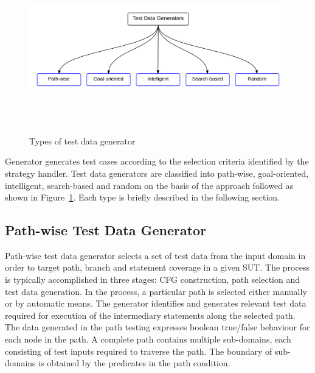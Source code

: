 \bigskip
\begin{figure}[h]
	\centering
	\centerline{\includegraphics[width=16.5cm, height=7.2cm ]{chapter2/Generators.png}}
	\bigskip
	\caption{Types of test data generator}
	\label{testDataGenerators_2}
\end{figure}
\bigskip

Generator generates test cases according to the selection criteria identified by the strategy handler. Test data generators are classified into path-wise, goal-oriented, intelligent, search-based and random on the basis of the approach followed as shown in Figure~\ref{testDataGenerators_2}. Each type is briefly described in the following section.

\subsection{Path-wise Test Data Generator} 
\label{sec:pathwise_2}
Path-wise test data generator selects a set of test data from the input domain in order to target path, branch and statement coverage in a given SUT. The process is typically accomplished in three stages: CFG construction, path selection and test data generation. In the process, a particular path is selected either manually or by automatic means. The generator identifies and generates relevant test data required for execution of the intermediary statements along the selected path. The data generated in the path testing expresses boolean true/false behaviour for each node in the path. A complete path contains multiple sub-domains, each consisting of test inputs required to traverse the path. The boundary of sub-domains is obtained by the predicates in the path condition. %

